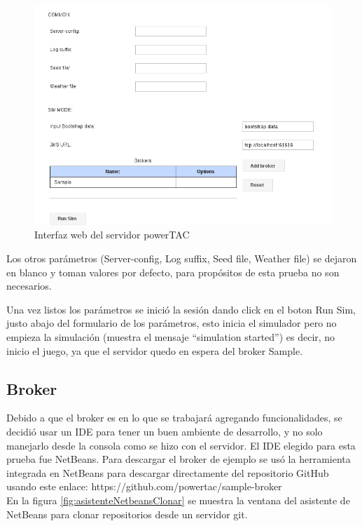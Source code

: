 \begin{figure}[!h]
	\centering
	\includegraphics[width=13cm]{img/interfazFormularioWeb.png}
	\caption{Interfaz web del servidor powerTAC}
	\label{fig:interfazFormularioWeb}
\end{figure}

Los otros parámetros (Server-config, Log suffix, Seed file, Weather file) se dejaron en blanco y toman valores por defecto, para propósitos de esta prueba no son necesarios.

Una vez listos los parámetros se inició la sesión dando click en el boton Run Sim, justo abajo del formulario de los parámetros, esto inicia el simulador pero no empieza la simulación %
(muestra el mensaje ``simulation started'') 
es decir, no inicio el juego, ya que el servidor quedo en espera del broker Sample.

\subsection{Broker}
Debido a que el broker es en lo que se trabajará agregando funcionalidades, se decidió usar un IDE para tener un buen ambiente de desarrollo, y no solo manejarlo desde la consola como se hizo con el servidor. El IDE elegido para esta prueba fue NetBeans.
Para descargar el broker de ejemplo se usó la herramienta integrada en NetBeans para descargar directamente del repositorio GitHub usando este enlace: \textsf{https://github.com/powertac/sample-broker}\\
En la figura \ref{fig:asistenteNetbeansClonar} se muestra la ventana del asistente de NetBeans para clonar repositorios desde un servidor git.

